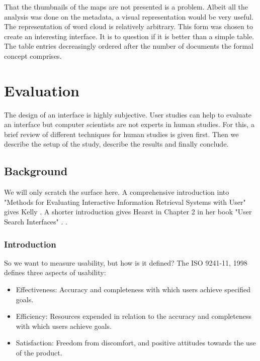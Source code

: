 \documentclass[11pt]{report}
\begin{document}
That the thumbnails of the maps are not presented is a problem. Albeit all the analysis was done on the metadata, a visual representation would be very useful. \\

The representation of word cloud is relatively arbitrary. This form was chosen to create an interesting interface. It is to question if it is better than a simple table. The table entries decreasingly ordered after the number of documents the formal concept comprises.

\chapter{Evaluation}
\label{Evaluation}

The design of an interface is highly subjective. User studies can help to evaluate an interface but computer scientists are not experts in human studies. For this, a brief review of different techniques for human studies is given first. Then we describe the setup of the study, describe the results and finally conclude. \\

\section{Background}

We will only scratch the surface here. A comprehensive introduction into "Methods for Evaluating Interactive Information Retrieval Systems with User" gives Kelly \cite{Kelly2007}. A shorter introduction gives Hearst in Chapter 2 in her book "User Search Interfaces" . \cite{Hearst2009}.\\

\subsection{Introduction}

So we want to measure usability, but how is it defined? The ISO 9241-11, 1998 \cite{ISO} defines three aspects of usability:
\begin{itemize}
	\item Effectiveness: Accuracy and completeness with which users achieve specified goals.
	\item Efficiency: Resources expended in relation to the accuracy and completeness with which users achieve goals.
	\item Satisfaction: Freedom from discomfort, and positive attitudes towards the use of the product.
\end{itemize}
\end{document}

